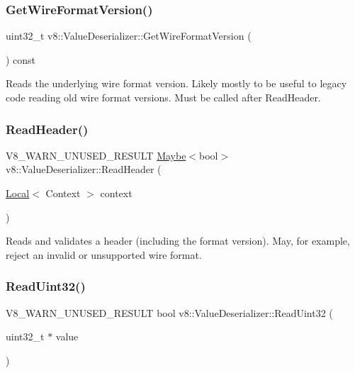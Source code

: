 \subsubsection{\texorpdfstring{Get\+Wire\+Format\+Version()}{GetWireFormatVersion()}}
{\footnotesize\ttfamily uint32\+\_\+t v8\+::\+Value\+Deserializer\+::\+Get\+Wire\+Format\+Version (\begin{DoxyParamCaption}{ }\end{DoxyParamCaption}) const}

Reads the underlying wire format version. Likely mostly to be useful to legacy code reading old wire format versions. Must be called after Read\+Header. \mbox{\label{classv8_1_1ValueDeserializer_a5b6c24dcdd0fa8b241cf45d058f1270c}} 
\subsubsection{\texorpdfstring{Read\+Header()}{ReadHeader()}}
{\footnotesize\ttfamily V8\+\_\+\+W\+A\+R\+N\+\_\+\+U\+N\+U\+S\+E\+D\+\_\+\+R\+E\+S\+U\+LT \mbox{\hyperlink{classv8_1_1Maybe}{Maybe}}$<$bool$>$ v8\+::\+Value\+Deserializer\+::\+Read\+Header (\begin{DoxyParamCaption}\item[{\mbox{\hyperlink{classv8_1_1Local}{Local}}$<$ Context $>$}]{context }\end{DoxyParamCaption})}

Reads and validates a header (including the format version). May, for example, reject an invalid or unsupported wire format. \mbox{\label{classv8_1_1ValueDeserializer_a77133b51f7cbad0bdd5faf1f32457abb}} 
\subsubsection{\texorpdfstring{Read\+Uint32()}{ReadUint32()}}
{\footnotesize\ttfamily V8\+\_\+\+W\+A\+R\+N\+\_\+\+U\+N\+U\+S\+E\+D\+\_\+\+R\+E\+S\+U\+LT bool v8\+::\+Value\+Deserializer\+::\+Read\+Uint32 (\begin{DoxyParamCaption}\item[{uint32\+\_\+t $\ast$}]{value }\end{DoxyParamCaption})}

